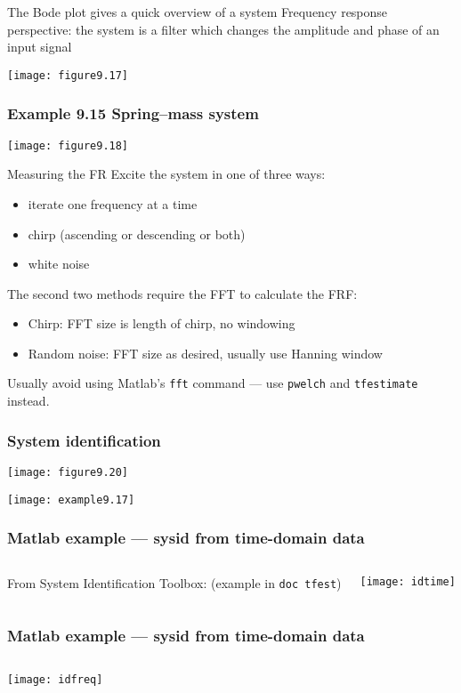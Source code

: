 \documentclass{beamer-control}
\begin{document}
\begin{frame}{The Bode plot gives a quick overview of a system}
Frequency response perspective: the system is a filter which changes the amplitude and phase of an input signal

\vfill
\centering
\texttt{[image: figure9.17]}

\end{frame}

\begin{frame}
\frametitle{Example 9.15 Spring--mass system}

\centering
\texttt{[image: figure9.18]}


\end{frame}



\begin{frame}{Measuring the FR}
Excite the system in one of three ways:
\begin{itemize}
\item iterate one frequency at a time
\item chirp (ascending or descending or both)
\item white noise
\end{itemize}
The second two methods require the FFT to calculate the FRF:
\begin{itemize}
\item Chirp: FFT size is length of chirp, no windowing
\item Random noise: FFT size as desired, usually use Hanning window
\end{itemize}
Usually avoid using Matlab's \texttt{fft} command --- use \texttt{pwelch} and \texttt{tfestimate} instead.
\end{frame}

\begin{frame}
\frametitle{System identification}
\centering

\texttt{[image: figure9.20]}

\hrulefill
\vfill

\texttt{[image: example9.17]}


\end{frame}

\begin{frame}
\frametitle{Matlab example --- sysid from time-domain data}

\small
\begin{columns}
From System Identification Toolbox: (example in \texttt{doc tfest})

\texttt{[image: idtime]}

\end{columns}

\end{frame}

\begin{frame}
\frametitle{Matlab example --- sysid from time-domain data}
\small

\begin{columns}

\texttt{[image: idfreq]}
\end{columns}
\end{frame}

\SUMMARYFRAME
\FINALE
\end{document}
